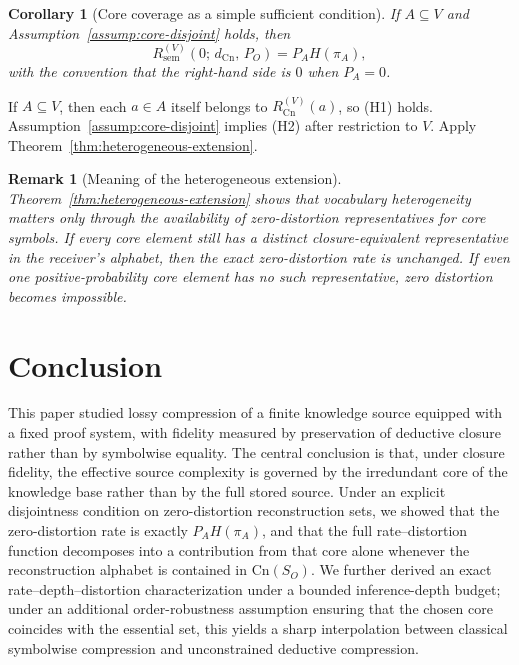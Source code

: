\documentclass[journal,onecolumn]{IEEEtran}
\makeatletter
\newcommand{\Cn}{\text{Cn}}
\newtheorem{corollary}{Corollary}[section]
\newtheorem{remark}{Remark}[section]
\numberwithin{equation}{section}
\renewenvironment{proof}[1][\proofname]{\par
  \pushQED{\qed}%
  \normalfont \topsep6\p@\@plus6\p@\relax
  \trivlist
  \item[\hskip\labelsep
        \itshape
    #1\@addpunct{.}]\ignorespaces
}{%
  \popQED\endtrivlist\@endpefalse
}
\makeatother
\begin{document}
\begin{corollary}[Core coverage as a simple sufficient condition]
\label{cor:heterogeneous-core-coverage}
If \(A\subseteq V\) and Assumption~\ref{assump:core-disjoint}
holds, then
\[
  R_{\mathrm{sem}}^{(V)}(0;\,d_{\Cn},\,P_O)
  =
  P_AH(\pi_A),
\]
with the convention that the right-hand side is \(0\) when
\(P_A=0\).
\end{corollary}

\begin{proof}
If \(A\subseteq V\), then each \(a\in A\) itself belongs to
\(R_{\Cn}^{(V)}(a)\), so \textup{(H1)} holds.
Assumption~\ref{assump:core-disjoint} implies \textup{(H2)} after
restriction to \(V\).
Apply Theorem~\ref{thm:heterogeneous-extension}.
\end{proof}

\begin{remark}[Meaning of the heterogeneous extension]
\label{rem:heterogeneous-meaning}
Theorem~\ref{thm:heterogeneous-extension} shows that vocabulary
heterogeneity matters only through the availability of
zero-distortion representatives for core symbols.
If every core element still has a distinct closure-equivalent
representative in the receiver's alphabet, then the exact
zero-distortion rate is unchanged.
If even one positive-probability core element has no such
representative, zero distortion becomes impossible.
\end{remark}

\section{Conclusion}
\label{sec:conclusion}

This paper studied lossy compression of a finite knowledge source equipped with a fixed proof system, with fidelity measured by preservation of deductive closure rather than by symbolwise equality. The central conclusion is that, under closure fidelity, the effective source complexity is governed by the irredundant core of the knowledge base rather than by the full stored source. Under an explicit disjointness condition on zero-distortion reconstruction sets, we showed that the zero-distortion rate is exactly \(P_A H(\pi_A)\), and that the full rate--distortion function decomposes into a contribution from
that core alone whenever the reconstruction alphabet is contained in
\(\Cn(S_O)\). We further derived an exact rate--depth--distortion characterization
under a bounded inference-depth budget; under an
additional order-robustness assumption ensuring that the chosen core
coincides with the essential set, this yields a sharp interpolation
between classical symbolwise compression and unconstrained deductive
compression.
\end{document}
